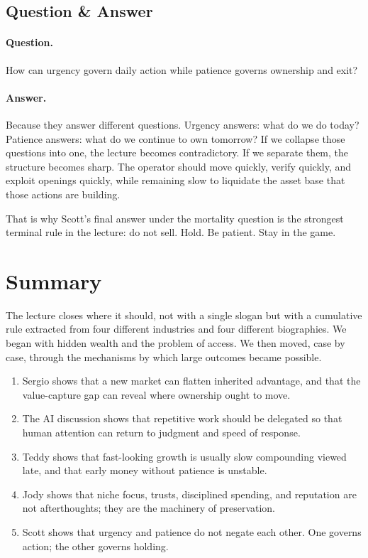 \subsection{Question \& Answer}

\paragraph{Question.}
How can urgency govern daily action while patience governs ownership and exit?

\paragraph{Answer.}
Because they answer different questions. Urgency answers: what do we do today? Patience answers: what do we continue to own tomorrow? If we collapse those questions into one, the lecture becomes contradictory. If we separate them, the structure becomes sharp. The operator should move quickly, verify quickly, and exploit openings quickly, while remaining slow to liquidate the asset base that those actions are building.

That is why Scott's final answer under the mortality question is the strongest terminal rule in the lecture: do not sell. Hold. Be patient. Stay in the game.

\section{Summary}

The lecture closes where it should, not with a single slogan but with a cumulative rule extracted from four different industries and four different biographies. We began with hidden wealth and the problem of access. We then moved, case by case, through the mechanisms by which large outcomes became possible.

\begin{enumerate}
\item Sergio shows that a new market can flatten inherited advantage, and that the value-capture gap can reveal where ownership ought to move.
\item The AI discussion shows that repetitive work should be delegated so that human attention can return to judgment and speed of response.
\item Teddy shows that fast-looking growth is usually slow compounding viewed late, and that early money without patience is unstable.
\item Jody shows that niche focus, trusts, disciplined spending, and reputation are not afterthoughts; they are the machinery of preservation.
\item Scott shows that urgency and patience do not negate each other. One governs action; the other governs holding.
\end{enumerate}

